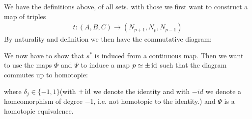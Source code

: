 \begin{cor}
	We have the definitions above, of all sets. with those we first want to construct a map of triples
	\begin{align*}
		t:(A,B,C)\to (N_{p+1},N_p,N_{p-1})
	\end{align*} By naturality and definition we then have the commutative diagram: 
	\begin{center}
	\end{center} 
	We now have to show that $s^*$ is induced from a continuous map. Then we want to use the maps $\Phi$ and $\Psi$ to induce a map $p\simeq \pm \operatorname{\text{id}} $ such that the diagram commutes up to homotopie:
	\begin{center}
	\end{center} where $\delta_j\in \{-1,1\}$(with $+\operatorname{\text{id}}$ we denote the identity and with $-id$ we denote a homeomorphism of degree $-1$, i.e. not homotopic to the identity.) and $\Psi$ is a homotopie equivalence. 

\end{cor}
